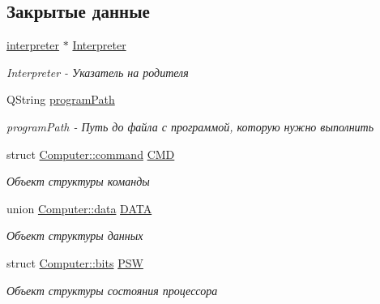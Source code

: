 \subsection*{Закрытые данные}
\begin{DoxyCompactItemize}
\item 
\hyperlink{classinterpreter}{interpreter} $\ast$ \hyperlink{class_computer_aa58d6e565412d6705657c0418b1e59fe}{Interpreter}
\begin{DoxyCompactList}\small\item\em Interpreter -\/ Указатель на родителя \end{DoxyCompactList}\item 
\hypertarget{class_computer_a05fb0474bddcf52789780fd6457cefac}{}\label{class_computer_a05fb0474bddcf52789780fd6457cefac} 
Q\+String \hyperlink{class_computer_a05fb0474bddcf52789780fd6457cefac}{program\+Path}
\begin{DoxyCompactList}\small\item\em program\+Path -\/ Путь до файла с программой, которую нужно выполнить \end{DoxyCompactList}\item 
\hypertarget{class_computer_a8423168f7cc356b4dd36977603798caf}{}\label{class_computer_a8423168f7cc356b4dd36977603798caf} 
struct \hyperlink{struct_computer_1_1command}{Computer\+::command} \hyperlink{class_computer_a8423168f7cc356b4dd36977603798caf}{C\+MD}
\begin{DoxyCompactList}\small\item\em Объект структуры команды \end{DoxyCompactList}\item 
\hypertarget{class_computer_adb154047da2156e4419af3b3a4a766b7}{}\label{class_computer_adb154047da2156e4419af3b3a4a766b7} 
union \hyperlink{union_computer_1_1data}{Computer\+::data} \hyperlink{class_computer_adb154047da2156e4419af3b3a4a766b7}{D\+A\+TA}
\begin{DoxyCompactList}\small\item\em Объект структуры данных \end{DoxyCompactList}\item 
\hypertarget{class_computer_aada011a29d87bb979835371a5f09805e}{}\label{class_computer_aada011a29d87bb979835371a5f09805e} 
struct \hyperlink{struct_computer_1_1bits}{Computer\+::bits} \hyperlink{class_computer_aada011a29d87bb979835371a5f09805e}{P\+SW}
\begin{DoxyCompactList}\small\item\em Объект структуры состояния процессора \end{DoxyCompactList}\item 

\end{DoxyCompactItemize}
